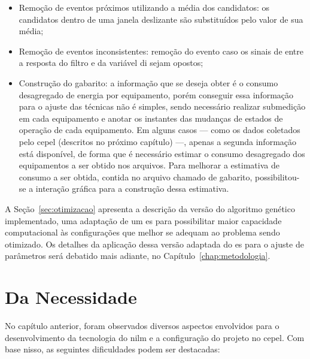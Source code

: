 \begin{itemize}
\item Remoção de eventos próximos utilizando a média dos candidatos:
os candidatos dentro de uma janela deslizante são substituídos pelo valor
de sua média;
\item Remoção de eventos inconsistentes: remoção do evento caso os
sinais de entre a resposta do filtro e da variável \acs{di} sejam
opostos;
\item Construção do gabarito: a informação que se deseja obter é o
consumo desagregado de energia por equipamento, porém conseguir essa
informação para o ajuste das técnicas não é simples, sendo necessário
realizar submedição em cada equipamento e anotar os instantes das
mudanças de estados de operação de cada equipamento. Em alguns casos
--- como os dados coletados pelo \acs{cepel} (descritos no próximo
capítulo) ---, apenas a segunda informação está disponível, de forma
que é necessário estimar o consumo desagregado dos equipamentos a ser
obtido nos arquivos. Para melhorar a estimativa de consumo a ser
obtida, contida no arquivo chamado de gabarito, possibilitou-se a
interação gráfica para a construção dessa estimativa.
\end{itemize}

A Seção~\ref{sec:otimizacao} apresenta a descrição da versão do
algoritmo genético implementado, uma adaptação de um \gls{es} para
possibilitar maior capacidade computacional às configurações que
melhor se adequam ao problema sendo otimizado. Os detalhes da
aplicação dessa versão adaptada do \gls{es} para o ajuste de
parâmetros será debatido mais adiante, no
Capítulo~\ref{chap:metodologia}.

\section{Da Necessidade}
\label{sec:motivacao_framework}

No capítulo anterior, foram observados diversos aspectos envolvidos
para o desenvolvimento da tecnologia do \gls{nilm} e a configuração do
projeto no \gls{cepel}. Com base nisso, as seguintes dificuldades
podem ser destacadas:

